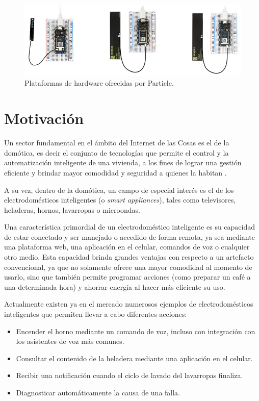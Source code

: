 \begin{figure}[h]
\centering
\includegraphics[scale=0.34]{./Figures/particle_iot.png}
\caption[Plataformas de hardware ofrecidas por Particle.]{Plataformas de hardware ofrecidas por Particle.\footnotemark}
\label{fig:particle_iot}
\end{figure}



\section{Motivación{}}

Un sector fundamental en el ámbito del Internet de las Cosas es el de la domótica, es decir el conjunto de tecnologías que permite el control y la automatización inteligente de una vivienda, a los fines de lograr una gestión eficiente y brindar mayor comodidad y seguridad a quienes la habitan \citep{6}.

A su vez, dentro de la domótica, un campo de especial interés es el de los electrodomésticos inteligentes (o \emph{smart appliances}), tales como televisores, heladeras, hornos, lavarropas o microondas. 

Una característica primordial de un electrodoméstico inteligente es su capacidad de
estar conectado y ser manejado o accedido de forma remota, ya sea mediante una plataforma web, una aplicación en el celular, comandos de voz o cualquier otro medio. Esta capacidad brinda grandes ventajas con respecto a un artefacto convencional, ya que no solamente ofrece una mayor comodidad al momento de usarlo, sino que también permite programar acciones (como preparar un café a una determinada hora) y ahorrar energía al hacer más eficiente su uso.

Actualmente existen ya en el mercado numerosos ejemplos de electrodomésticos inteligentes que permiten llevar a cabo diferentes acciones:
\begin{itemize}
	\item Encender el horno mediante un comando de voz, incluso con integración con los asistentes de voz más comunes.
	\item Consultar el contenido de la heladera mediante una aplicación en el celular.
	\item Recibir una notificación cuando el ciclo de lavado del lavarropas finaliza.
	\item Diagnosticar automáticamente la causa de una falla.
\end{itemize}


